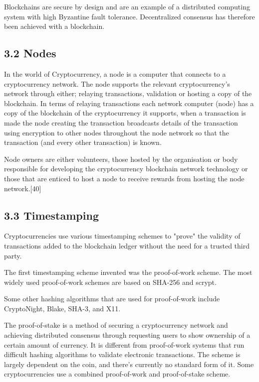 Blockchains are secure by design and are an example of a distributed computing system with high Byzantine fault tolerance. Decentralized consensus has therefore been achieved with a blockchain.\vspace{.3cm}

\subsection*{3.2 Nodes}
In the world of Cryptocurrency, a node is a computer that connects to a cryptocurrency network. The node supports the relevant cryptocurrency's network through either; relaying transactions, validation or hosting a copy of the blockchain. In terms of relaying transactions each network computer (node) has a copy of the blockchain of the cryptocurrency it supports, when a transaction is made the node creating the transaction broadcasts details of the transaction using encryption to other nodes throughout the node network so that the transaction (and every other transaction) is known.\vspace{.3cm}

Node owners are either volunteers, those hosted by the organisation or body responsible for developing the cryptocurrency blockchain network technology or those that are enticed to host a node to receive rewards from hosting the node network.[40]\vspace{.3cm}

\subsection*{3.3 Timestamping}
Cryptocurrencies use various timestamping schemes to "prove" the validity of transactions added to the blockchain ledger without the need for a trusted third party.\vspace{.3cm}

The first timestamping scheme invented was the proof-of-work scheme. The most widely used proof-of-work schemes are based on SHA-256 and scrypt.\vspace{.3cm}

Some other hashing algorithms that are used for proof-of-work include CryptoNight, Blake, SHA-3, and X11.\vspace{.3cm}

The proof-of-stake is a method of securing a cryptocurrency network and achieving distributed consensus through requesting users to show ownership of a certain amount of currency. It is different from proof-of-work systems that run difficult hashing algorithms to validate electronic transactions. The scheme is largely dependent on the coin, and there's currently no standard form of it. Some cryptocurrencies use a combined proof-of-work and proof-of-stake scheme.